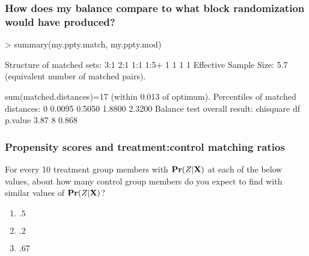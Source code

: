 \begin{frame}[fragile]
  \frametitle{How does my balance compare to what block randomization
    would have produced?}
\begin{Schunk}
\begin{Sinput}
> summary(my.ppty.match, my.ppty.mod)
\end{Sinput}
\begin{Soutput}
Structure of matched sets:
 3:1  2:1  1:1 1:5+ 
   1    1    1    1 
Effective Sample Size:  5.7 
(equivalent number of matched pairs).

sum(matched.distances)=17
(within 0.013 of optimum).
Percentiles of matched distances:
    0%    50%    95%   100% 
0.0095 0.5050 1.8800 2.3200 
Balance test overall result:
  chisquare df p.value
       3.87  8   0.868
\end{Soutput}
\end{Schunk}
\end{frame}


\begin{frame}
  \frametitle{Propensity scores and treatment:control matching ratios}
  
  For every 10 treatment group members with $\mathbf{Pr}(Z|\mathbf{X})$ at each of the below values, about how many control group members do you expect to find with similar values of $\mathbf{Pr}(Z|\mathbf{X})$?
  
  \begin{enumerate}
  \item $.5 $
  \item $.2 $
  \item $.67 $
  \end{enumerate}
\end{frame}


